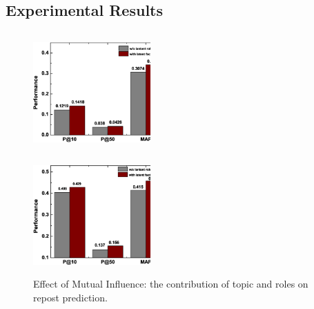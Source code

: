 \documentclass[runningheads,a4paper]{llncs}
\begin{document}
\subsection{Experimental Results}
\begin{figure}[ht]
\centering
{}
\hspace{5mm}
{\includegraphics[width=0.40\textwidth,height=1.8in]{weibo_mupb.eps}
\label{fig:2b}}
\hspace{5mm}

\centering
{}
\hspace{5mm}
{\includegraphics[width=0.4\textwidth,height=1.5in]{citation_mupb.eps}
\label{fig:2d}}
\hspace{5mm}



\caption{Effect of Mutual Influence: the contribution of topic and roles on repost prediction.}\label{fig2}
\end{figure}
\end{document}
